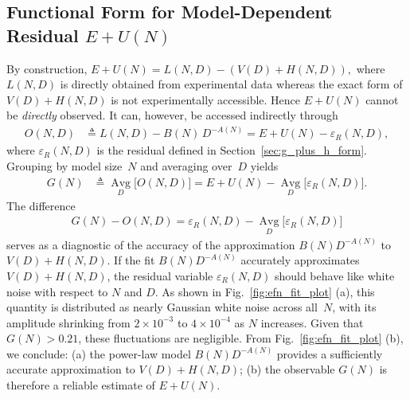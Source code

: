 \documentclass{article}
\begin{document}
\subsection{Functional Form for Model-Dependent Residual $E+U(N)$} \label{sec:e_f_form}
By construction,
\(
E+U(N)=L(N,D)-(V(D)+H(N,D)),
\)
where \(L(N,D)\) is directly obtained from experimental data whereas the exact form of
\(V(D)+H(N,D)\) is not experimentally accessible.
Hence \(E+U(N)\) cannot be \emph{directly} observed.
It can, however, be accessed indirectly through
\begin{align}
  O(N,D) &\triangleq L(N,D) - B(N)\,D^{-A(N)}
          = E + U(N) - \varepsilon_R(N,D),
\end{align}
where \(\varepsilon_R(N,D)\) is the residual defined in
Section~\ref{sec:g_plus_h_form}.
Grouping by model size~\(N\) and averaging over~\(D\) yields
\begin{align}
  G(N) &\triangleq \operatorname*{Avg}_{D}\!\bigl[O(N,D)\bigr]
        = E + U(N) - \operatorname*{Avg}_{D}\!\bigl[\varepsilon_R(N,D)\bigr].
\end{align}
The difference
\begin{align}
  G(N)-O(N,D)
  = \varepsilon_R(N,D)
    - \operatorname*{Avg}_{D}\!\bigl[\varepsilon_R(N,D)\bigr]
\end{align}
serves as a diagnostic of the accuracy of the
approximation \(B(N)D^{-A(N)}\) to \(V(D)+H(N,D)\).
If the fit $B(N)D^{-A(N)}$ accurately approximates $V(D) + H(N,D)$, the residual variable $\varepsilon_R(N,D)$ should behave like white noise with respect to $N$ and $D$. 
As shown in Fig.~\ref{fig:efn_fit_plot} (a), this quantity is distributed
as nearly Gaussian white noise across all~\(N\), with its amplitude
shrinking from \(2\times10^{-3}\) to \(4\times10^{-4}\) as \(N\) increases.
Given that \(G(N)>0.21\), these fluctuations are
negligible.
From Fig.~\ref{fig:efn_fit_plot} (b), we conclude:
(a) the power-law model \(B(N)D^{-A(N)}\) provides a sufficiently accurate approximation to \(V(D)+H(N,D)\);
(b) the observable \(G(N)\) is therefore a reliable estimate of \(E+U(N)\).
\end{document}

